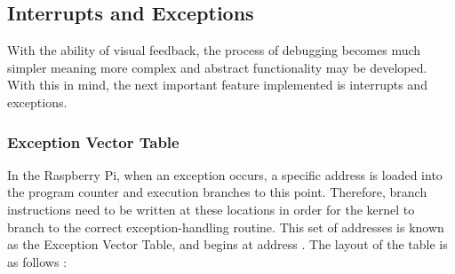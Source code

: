 \subsection{Interrupts and Exceptions}
    With the ability of visual feedback, the process of debugging becomes much
    simpler meaning more complex and abstract functionality may be developed.
    With this in mind, the next important feature implemented is interrupts and
    exceptions.

    \subsubsection{Exception Vector Table}
        In the Raspberry Pi, when an exception occurs, a specific address is
        loaded into the program counter and execution branches to this point.
        Therefore, branch instructions need to be written at these locations in
        order for the kernel to branch to the correct exception-handling
        routine. This set of addresses is known as the Exception Vector Table,
        and begins at address . The layout of the table is as follows
        \cite[pg.~A2-16]{ARMARM}:
